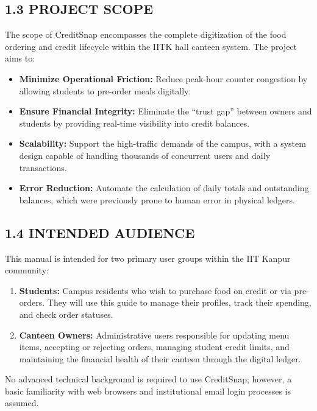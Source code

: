 \documentclass[a4paper,12pt]{article}
\begin{document}
\subsection*{1.3 PROJECT SCOPE}
\label{sec:scope}

The scope of CreditSnap encompasses the complete digitization of the food ordering and credit lifecycle within the IITK hall canteen system. The project aims to:

\begin{itemize}
    \item \textbf{Minimize Operational Friction:} Reduce peak-hour counter congestion by allowing students to pre-order meals digitally.
    \item \textbf{Ensure Financial Integrity:} Eliminate the ``trust gap'' between owners and students by providing real-time visibility into credit balances.
    \item \textbf{Scalability:} Support the high-traffic demands of the campus, with a system design capable of handling thousands of concurrent users and daily transactions.
    \item \textbf{Error Reduction:} Automate the calculation of daily totals and outstanding balances, which were previously prone to human error in physical ledgers.
\end{itemize}

\subsection*{1.4 INTENDED AUDIENCE}
\label{sec:audience}

This manual is intended for two primary user groups within the IIT Kanpur community:

\begin{enumerate}
    \item \textbf{Students:} Campus residents who wish to purchase food on credit or via pre-orders. They will use this guide to manage their profiles, track their spending, and check order statuses.
    \item \textbf{Canteen Owners:} Administrative users responsible for updating menu items, accepting or rejecting orders, managing student credit limits, and maintaining the financial health of their canteen through the digital ledger.
\end{enumerate}

No advanced technical background is required to use CreditSnap; however, a basic familiarity with web browsers and institutional email login processes is assumed.
\end{document}

